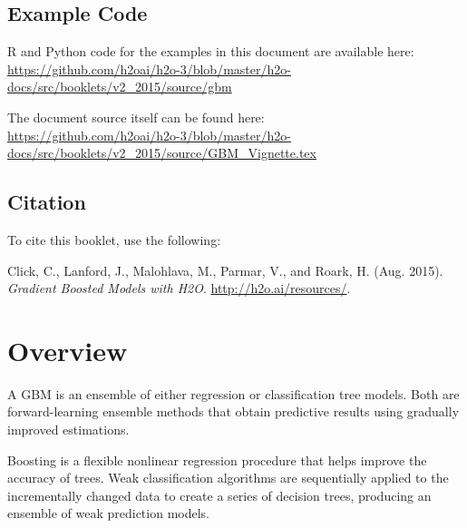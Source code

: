 


\newcommand{\waterVersion}{3.2.0.1}



\subsection{Example Code}

R and Python code for the examples in this document are available here:\\
\url{https://github.com/h2oai/h2o-3/blob/master/h2o-docs/src/booklets/v2_2015/source/gbm}

The document source itself can be found here:\\
\url{https://github.com/h2oai/h2o-3/blob/master/h2o-docs/src/booklets/v2_2015/source/GBM_Vignette.tex}

\subsection{Citation}

To cite this booklet, use the following: 

Click, C., Lanford, J., Malohlava, M., Parmar, V., and Roark, H. (Aug. 2015). \textit{Gradient Boosted Models with H2O}. \url{http://h2o.ai/resources/}. 

\newpage

\section{Overview}

A GBM is an ensemble of either regression or classification tree models.
Both are forward-learning ensemble methods that obtain predictive results using gradually improved estimations.

Boosting is a flexible nonlinear regression procedure that helps improve the accuracy of trees. Weak classification algorithms are sequentially applied to the incrementally changed data to create a series of decision trees, producing an ensemble of weak prediction models. 

